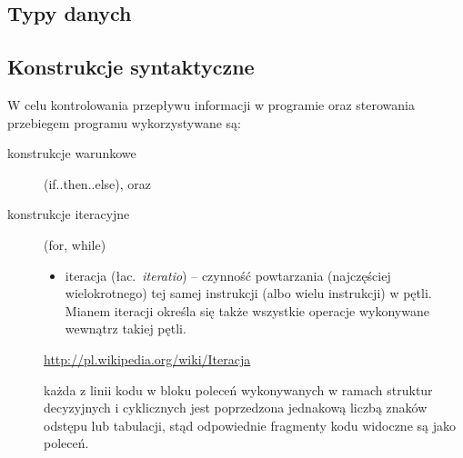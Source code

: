 

\subsection{Typy danych}

\subsection{Konstrukcje syntaktyczne}

\begin{frame}
W celu kontrolowania przepływu informacji w programie oraz sterowania
przebiegem programu wykorzystywane są:
\begin{description}
\item[konstrukcje warunkowe] (if..then..else), oraz
\item[konstrukcje iteracyjne] (for, while)
 \begin{itemize}\scriptsize \item iteracja (łac.\ \emph{iteratio}) --
 czynność powtarzania (najczęściej wielokrotnego) tej samej instrukcji
 (albo wielu instrukcji) w pętli. Mianem iteracji określa się także
 wszystkie operacje wykonywane wewnątrz takiej pętli.
 \end{itemize}
\hfill\tiny\url{http://pl.wikipedia.org/wiki/Iteracja}
\end{description}

\begin{description}

 \item[] każda z linii kodu w bloku poleceń
 wykonywanych w ramach struktur decyzyjnych i cyklicznych jest
 poprzedzona jednakową liczbą znaków odstępu lub tabulacji, stąd
 odpowiednie fragmenty kodu widoczne są jako  poleceń.
\end{description}

\end{frame}

